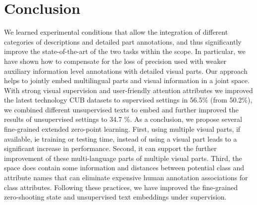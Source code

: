 \documentclass[10pt,twocolumn,letterpaper]{article}
\begin{document}
\section{Conclusion}
We learned experimental conditions that allow the integration of different categories of descriptions and detailed part annotations, and thus significantly improve the state-of-the-art of the two tasks within the scope. In particular, we have shown how to compensate for the loss of precision used with weaker auxiliary information level annotations with detailed visual parts. Our approach helps to jointly embed multilingual parts and visual information in a joint space. With strong visual supervision and user-friendly attention attributes we improved the latest technology CUB datasets to supervised settings in 56.5\% (from 50.2\%), we combined different unsupervised texts to embed and further improved the results of unsupervised settings to 34.7 \%. As a conclusion, we propose several fine-grained extended zero-point learning. First, using multiple visual parts, if available, ie training or testing time, instead of using a visual part leads to a significant increase in performance. Second, it can support the further improvement of these multi-language parts of multiple visual parts. Third, the space does contain some information and distances between potential class and attribute names that can eliminate expensive human annotation associations for class attributes. Following these practices, we have improved the fine-grained zero-shooting state and unsupervised text embeddings under supervision.
{\small

}
\end{document}
